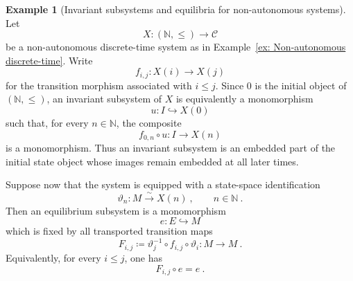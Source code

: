 \documentclass[a4paper,reqno,oneside]{amsart}
\theoremstyle{definition}
\newtheorem{example}[theorem]{Example}
\theoremstyle{remark}
\newcommand{\N}{\mathbb{N}}
\renewcommand{\theta}{\vartheta}
\numberwithin{equation}{section}
\begin{document}
	
	\begin{example}[Invariant subsystems and equilibria for non-autonomous systems]
		Let
		\begin{equation}
			X\colon (\N,\leq)\longrightarrow \mathcal C
		\end{equation}
		be a non-autonomous discrete-time system as in
		Example~\ref{ex: Non-autonomous discrete-time}. Write
		\begin{equation}
			f_{i,j}\colon X(i)\longrightarrow X(j)
		\end{equation}
		for the transition morphism associated with $i\leq j$. Since $0$ is the initial object of $(\mathbb N,\leq)$, an invariant subsystem of $X$ is equivalently a monomorphism \begin{equation} u\colon I\hookrightarrow X(0) \end{equation} such that, for every $n\in\mathbb N$, the composite \begin{equation} f_{0,n}\circ u\colon I\longrightarrow X(n) \end{equation} is a monomorphism. Thus an invariant subsystem is an embedded part of the initial state object whose images remain embedded at all later times.
 
		
		Suppose now that the system is equipped with a state-space identification
		\begin{equation}
			\theta_n\colon M\xrightarrow{\sim} X(n) \ ,
			\qquad n\in\N \ .
		\end{equation}
		Then an equilibrium subsystem is a monomorphism
		\begin{equation}
			e\colon E\hookrightarrow M
		\end{equation}
		which is fixed by all transported transition maps
		\begin{equation}
			F_{i,j}
			\coloneqq
			\theta_j^{-1}\circ f_{i,j}\circ \theta_i
			\colon M\longrightarrow M \ .
		\end{equation}
		Equivalently, for every $i\leq j$, one has
		\begin{equation}
			F_{i,j}\circ e=e \ .
		\end{equation}
		

\end{example}
\end{document}
